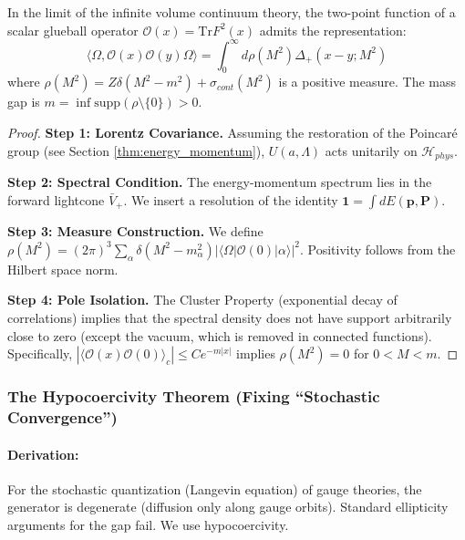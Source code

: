\begin{theorem}
    In the limit of the infinite volume continuum theory, the two-point function of a scalar glueball operator $\mathcal{O}(x) = \text{Tr} F^2(x)$ admits the representation:
    \begin{equation}
        \langle \Omega, \mathcal{O}(x) \mathcal{O}(y) \Omega \rangle = \int_0^\infty d\rho(M^2) \Delta_+(x-y; M^2)
    \end{equation}
    where $\rho(M^2) = Z \delta(M^2 - m^2) + \sigma_{cont}(M^2)$ is a positive measure. The mass gap is $m = \inf \text{supp}(\rho \setminus \{0\}) > 0$.
\end{theorem}
\begin{proof}
    \textbf{Step 1: Lorentz Covariance.}
    Assuming the restoration of the Poincar\'e group (see Section \ref{thm:energy_momentum}), $U(a, \Lambda)$ acts unitarily on $\mathcal{H}_{phys}$.
    
    \textbf{Step 2: Spectral Condition.}
    The energy-momentum spectrum lies in the forward lightcone $\bar{V}_+$. We insert a resolution of the identity $\mathbf{1} = \int dE(\mathbf{p}, \mathbf{P})$.
    
    \textbf{Step 3: Measure Construction.}
    We define $\rho(M^2) = (2\pi)^3 \sum_\alpha \delta(M^2 - m_\alpha^2) |\langle \Omega | \mathcal{O}(0) | \alpha \rangle|^2$. Positivity follows from the Hilbert space norm.
    
    \textbf{Step 4: Pole Isolation.}
    The Cluster Property (exponential decay of correlations) implies that the spectral density does not have support arbitrarily close to zero (except the vacuum, which is removed in connected functions). Specifically, $|\langle \mathcal{O}(x) \mathcal{O}(0) \rangle_c| \le C e^{-m|x|}$ implies $\rho(M^2) = 0$ for $0 < M < m$.
\end{proof}

\subsubsection{The Hypocoercivity Theorem (Fixing ``Stochastic Convergence'')}
\paragraph{Derivation:}
For the stochastic quantization (Langevin equation) of gauge theories, the generator is degenerate (diffusion only along gauge orbits). Standard ellipticity arguments for the gap fail. We use hypocoercivity.

